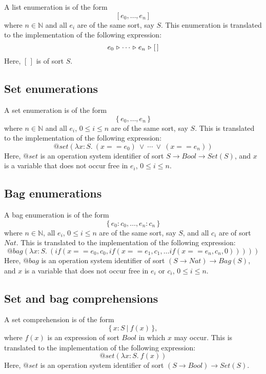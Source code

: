 \documentclass[a4paper,fleqn]{article}
\newcommand{\frm}[1]{\mbox{\ensuremath{#1}}}
\newcommand{\f}[1]{\ensuremath{\mathit{#1}}}
\newcommand{\fa}[2]{\ensuremath{\f{#1}(#2)}}
\newcommand{\faaa}[4]{\ensuremath{\f{#1}(#2, #3, #4)}}
\newcommand{\set}[1]{\ensuremath{\{\,#1\,\}}}
\newcommand{\scompr}[2]{\ensuremath{\set{#1\ |\ #2}}}
\newcommand{\el}{\ensuremath{[\,]}}
\newcommand{\cons}{\ensuremath{\hspace{0.12em}\triangleright\hspace{0.08em}}}
\newcommand{\nat}{\ensuremath{\mathbb{N}}}
\newcommand{\srtbool}{\f{Bool}}
\newcommand{\srtnat}{\f{Nat}}
\begin{document}
A list enumeration is of the form
\[[e_{0}, \dots, e_{n}]\]
where \frm{n \in \nat} and all \frm{e_{i}} are of the same sort, say \frm{S}.
This enumeration is translated to the implementation of the following
expression:
\[e_{0} \cons \cdots \cons e_{n} \cons \el\]
Here, \frm{\el} is of sort \frm{S}.

\subsection{Set enumerations}

A set enumeration is of the form
\[\set{e_{0}, \dots, e_{n}}\]
where \frm{n \in \nat} and all \frm{e_{i}}, \frm{0 \leq i \leq n} are of the
same sort, say \frm{S}.  This is translated to the implementation of the
following expression:
\[\fa{@set}{\lambda x{:}S.\ (x == e_{0})\ \lor\ \cdots\ \lor\ (x == e_{n})}\]
Here, \frm{\f{@set}} is an operation system identifier of sort \frm{S \to
\srtbool \to \fa{Set}{S}}, and \frm{x} is a variable that does not occur free
in \frm{e_{i}}, \frm{0 \leq i \leq n}.

\subsection{Bag enumerations}

A bag enumeration is of the form
\[\set{e_{0}: c_{0}, \dots, e_{n}: c_{n}}\]
where \frm{n \in \nat}, all \frm{e_{i}}, \frm{0 \leq i \leq n} are of the same
sort, say \frm{S}, and all \frm{c_{i}} are of sort \frm{\srtnat}.  This is
translated to the implementation of the following expression:
\[\fa{@bag}{\lambda x{:}S.\ (\faaa{if}{x == e_{0}}{c_{0}}{\faaa{if}{x ==
e_{1}}{c_{1}}{\ldots \faaa{if}{x == e_{n}}{c_{n}}{0}}})}\]
Here, \frm{\f{@bag}} is an operation system identifier of sort \frm{(S \to
\srtnat) \to \fa{Bag}{S}}, and \frm{x} is a variable that does not occur free
in \frm{e_{i}} or \frm{c_{i}}, \frm{0 \leq i \leq n}.

\subsection{Set and bag comprehensions}

A set comprehension is of the form
\[\scompr{x{:}S}{\fa{f}{x}},\]
where \frm{\fa{f}{x}} is an expression of sort \frm{\srtbool} in which \frm{x}
may occur. This is translated to the implementation of the following
expression:
\[\fa{@set}{\lambda x{:}S.\ \fa{f}{x}}\]
Here, \frm{\f{@set}} is an operation system identifier of sort \frm{(S \to
\srtbool) \to \fa{Set}{S}}.
\end{document}
